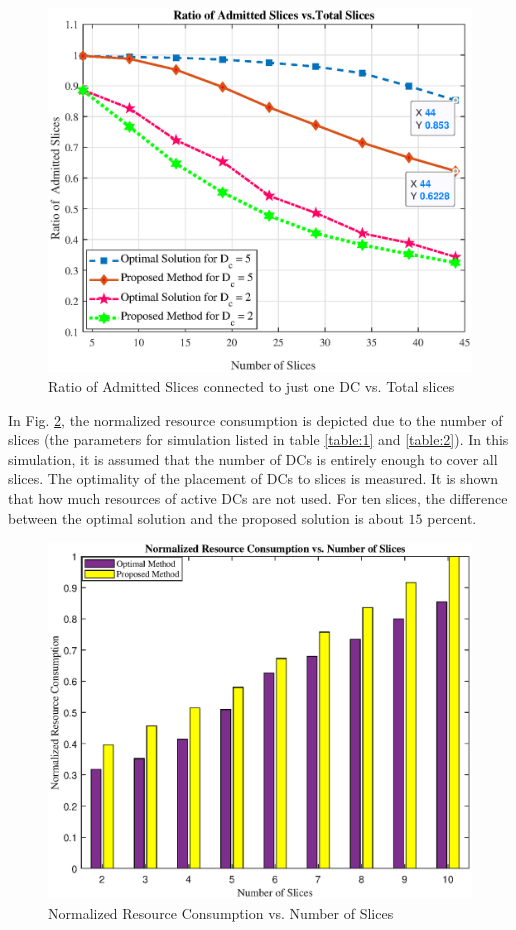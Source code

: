 \documentclass[conference]{IEEEtran}
\begin{document}
\begin{figure}%
  \centering
    \includegraphics[width=\linewidth]{f111}
  \caption{Ratio of Admitted Slices connected to just one DC vs. Total slices}
  \label{fig:f1}
\end{figure} 
In Fig. \ref{fig:f2}, the normalized resource consumption is depicted due to the number of slices (the parameters for simulation listed in table \ref{table:1} and \ref{table:2}). In this simulation, it is assumed that the number of DCs is entirely enough to cover all slices. The optimality of the placement of DCs to slices is measured. It is shown that how much resources of active DCs are not used. For ten slices, the difference between the optimal solution and the proposed solution is about $15$ percent. 
\begin{figure}%
  \centering
    \includegraphics[width=\linewidth]{fig2_last}
  \caption{Normalized Resource Consumption vs. Number of Slices}
  \label{fig:f2}
\end{figure} 
\end{document}

